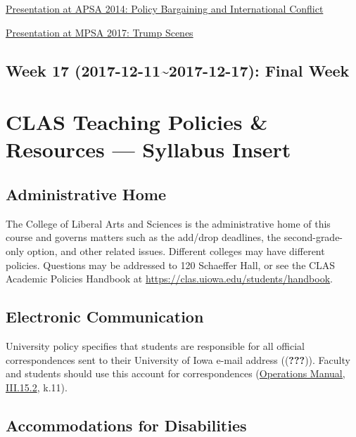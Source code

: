 \documentclass[11pt,]{article}
\theoremstyle{definition}
\theoremstyle{definition}
\theoremstyle{remark}
\begin{document}
\href{https://www.youtube.com/watch?v=bwNBXuz2eRg}{Presentation at APSA
2014: Policy Bargaining and International Conflict}

\href{https://www.youtube.com/watch?v=Z4ISkF2H4tk}{Presentation at MPSA
2017: Trump Scenes}

\subsection{Week 17 (2017-12-11\textasciitilde{}2017-12-17): Final
Week}\label{week-17-2017-12-112017-12-17-final-week}

\clearpage

\section{CLAS Teaching Policies \& Resources --- Syllabus
Insert}\label{clas-teaching-policies-resources-syllabus-insert}

\subsection{Administrative Home}\label{administrative-home}

The College of Liberal Arts and Sciences is the administrative home of
this course and governs matters such as the add/drop deadlines, the
second-grade-only option, and other related issues. Different colleges
may have different policies. Questions may be addressed to 120 Schaeffer
Hall, or see the CLAS Academic Policies Handbook at
\url{https://clas.uiowa.edu/students/handbook}.

\subsection{Electronic Communication}\label{electronic-communication}

University policy specifies that students are responsible for all
official correspondences sent to their University of Iowa e-mail address
(({\textbf{???}})). Faculty and students should use this account for
correspondences
(\href{https://opsmanual.uiowa.edu/human-resources/professional-ethics-and-academic-responsibility\#15.2}{Operations
Manual, III.15.2}, k.11).

\subsection{Accommodations for
Disabilities}\label{accommodations-for-disabilities}
\end{document}
